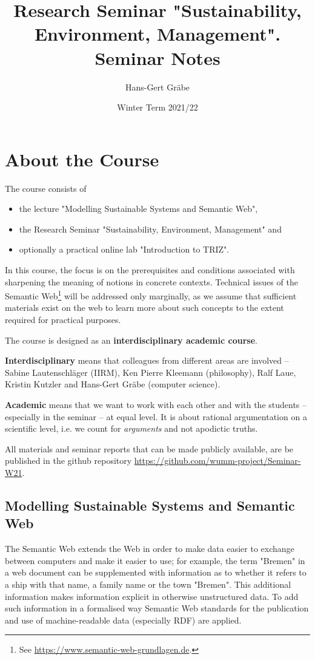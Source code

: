 \documentclass[11pt,a4paper]{article}
\title{Research Seminar "Sustainability, Environment, Management". Seminar
  Notes}
\author{Hans-Gert Gr\"abe}
\date{Winter Term 2021/22}
\begin{document}
\maketitle
\tableofcontents
\newpage

\section{About the Course}

The course consists of
\begin{itemize}
\item the lecture "Modelling Sustainable Systems and Semantic Web",
\item the Research Seminar "Sustainability, Environment, Management" and
\item optionally a practical online lab "Introduction to TRIZ". 
\end{itemize}

In this course, the focus is on the prerequisites and conditions associated
with sharpening the meaning of notions in concrete contexts. Technical issues
of the Semantic Web\footnote{See
  \url{https://www.semantic-web-grundlagen.de}.} will be addressed only
marginally, as we assume that sufficient materials exist on the web to learn
more about such concepts to the extent required for practical purposes.

The course is designed as an \textbf{interdisciplinary academic course}.

\textbf{Interdisciplinary} means that colleagues from different areas are
involved – Sabine Lautenschläger (IIRM), Ken Pierre Kleemann (philosophy),
Ralf Laue, Kristin Kutzler and Hans-Gert Gräbe (computer science).

\textbf{Academic} means that we want to work with each other and with the
students – especially in the seminar – at equal level. It is about rational
argumentation on a scientific level, i.e. we count for \emph{arguments} and not
apodictic truths.

All materials and seminar reports that can be made publicly available, are be
published in the github repository
\url{https://github.com/wumm-project/Seminar-W21}.

\subsection{Modelling Sustainable Systems and Semantic Web}

The Semantic Web extends the Web in order to make data easier to exchange
between computers and make it easier to use; for example, the term "Bremen" in
a web document can be supplemented with information as to whether it refers to
a ship with that name, a family name or the town "Bremen". This additional
information makes information explicit in otherwise unstructured data. To add
such information in a formalised way Semantic Web standards for the
publication and use of machine-readable data (especially RDF) are applied.
\end{document}
